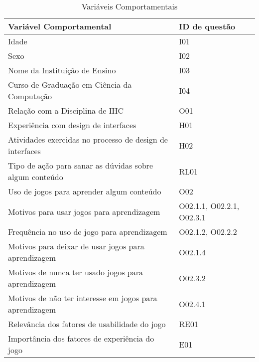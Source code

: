 \begin{table}[htbp]
\centering
\caption{Variáveis Comportamentais}
\label{tab:Table_variaveis-comp}
\begin{tabular}{|p{11.5cm}|p{3cm}|}
\hline
\textbf{Variável Comportamental}                          & \textbf{ID de questão}     \\ \hline
Idade                                                     & I01                          \\ \hline
Sexo                                                      & I02                          \\ \hline
Nome da Instituição de Ensino                             & I03                          \\ \hline
Curso de Graduação em Ciência da Computação               & I04                          \\ \hline
Relação com a Disciplina de IHC                           & O01                          \\ \hline
Experiência com design de interfaces                      & H01                          \\ \hline
Atividades exercidas no processo de design de interfaces  & H02                          \\ \hline
Tipo de ação para sanar as dúvidas sobre algum conteúdo   & RL01                         \\ \hline
Uso de jogos para aprender algum conteúdo                 & O02                          \\ \hline
Motivos para usar jogos para aprendizagem                 & O02.1.1, O02.2.1, O02.3.1    \\ \hline
Frequência no uso de jogo para aprendizagem               & O02.1.2, O02.2.2             \\ \hline
Motivos para deixar de usar jogos para aprendizagem       & O02.1.4                      \\ \hline
Motivos de nunca ter usado jogos para aprendizagem        & O02.3.2                      \\ \hline
Motivos de não ter interesse em jogos para aprendizagem  & O02.4.1                \\ \hline
Relevância dos fatores de usabilidade do jogo             & RE01                         \\ \hline
Importância dos fatores de experiência do jogo            & E01                          \\ \hline
\end{tabular}
\end{table}